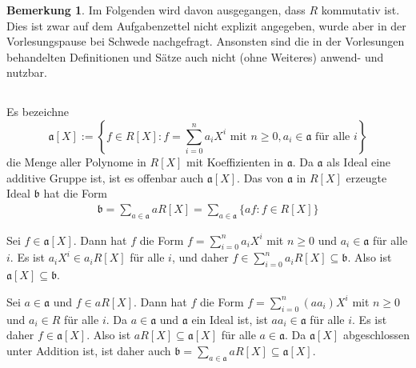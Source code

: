 \documentclass[a4paper,10pt]{article}
\theoremstyle{definition}
\newtheorem{bem}[beh]{Bemerkung}
\newcommand{\mf}[1]{\mathfrak{#1}}
\begin{document}
\begin{bem}
 Im Folgenden wird davon ausgegangen, dass $R$ kommutativ ist. Dies ist zwar auf dem Aufgabenzettel nicht explizit angegeben, wurde aber in der Vorlesungspause bei Schwede nachgefragt. Ansonsten sind die in der Vorlesungen behandelten Definitionen und Sätze auch nicht (ohne Weiteres) anwend- und nutzbar.
\end{bem}


\subsection{}
Es bezeichne
\[
 \mf{a}[X] := \left\{f \in R[X] : f = \sum_{i=0}^n a_i X^i \text{ mit } n \geq 0, a_i \in \mf{a} \text{ für alle } i\right\}
\]
die Menge aller Polynome in $R[X]$ mit Koeffizienten in $\mf{a}$. Da $\mf{a}$ als Ideal eine additive Gruppe ist, ist es offenbar auch $\mf{a}[X]$. Das von $\mf{a}$ in $R[X]$ erzeugte Ideal $\mf{b}$ hat die Form
\begin{align*}
 \mf{b} = \sum_{a \in \mf{a}} aR[X] = \sum_{a \in \mf{a}} \{af : f \in R[X] \}
\end{align*}

Sei $f \in \mf{a}[X]$. Dann hat $f$ die Form $f = \sum_{i=0}^n a_i X^i$ mit $n \geq 0$ und $a_i \in \mf{a}$ für alle $i$. Es ist $a_i X^i \in a_i R[X]$ für alle $i$, und daher $f \in \sum_{i=0}^n a_i R[X] \subseteq \mf{b}$. Also ist $\mf{a}[X] \subseteq \mf{b}$.

Sei $a \in \mf{a}$ und $f \in aR[X]$. Dann hat $f$ die Form $f = \sum_{i=0}^n (a a_i) X^i$ mit $n \geq 0$ und $a_i \in R$ für alle $i$. Da $a \in \mf{a}$ und $\mf{a}$ ein Ideal ist, ist $a a_i \in \mf{a}$ für alle $i$. Es ist daher $f \in \mf{a}[X]$. Also ist $aR[X] \subseteq \mf{a}[X]$ für alle $a \in \mf{a}$. Da $\mf{a}[X]$ abgeschlossen unter Addition ist, ist daher auch $\mf{b} = \sum_{a \in \mf{a}} aR[X] \subseteq \mf{a}[X]$.


\subsection{}
\end{document}

